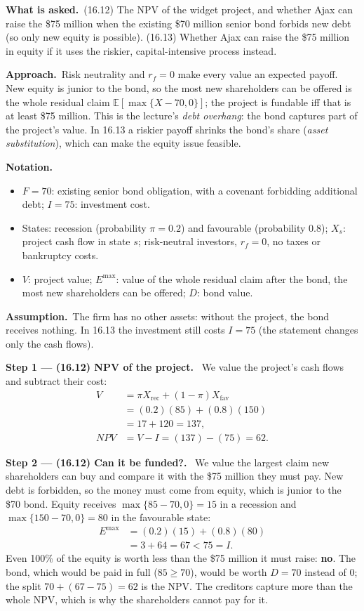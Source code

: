 \documentclass[11pt,a4paper]{article}
\newcommand{\notation}{\par\noindent\textbf{Notation.}}
\newcommand{\step}[2]{\par\medskip\noindent\textbf{Step #1 --- #2.}~}
\newcommand{\assume}{\par\smallskip\noindent\textbf{Assumption.}~}
\newcommand{\asked}{\par\medskip\noindent\textbf{What is asked.}~}
\newcommand{\approach}{\par\smallskip\noindent\textbf{Approach.}~}
\begin{document}
\asked (16.12) The NPV of the widget project, and whether Ajax can raise the \$75 million when
the existing \$70 million senior bond forbids new debt (so only new equity is possible).
(16.13) Whether Ajax can raise the \$75 million in equity if it uses the riskier, capital-intensive
process instead.

\approach Risk neutrality and $r_f=0$ make every value an expected payoff. New equity is junior to
the bond, so the most new shareholders can be offered is the whole residual claim
$\mathbb{E}[\max\{X-70,0\}]$; the project is fundable iff that is at least \$75 million. This is the
lecture's \emph{debt overhang}: the bond captures part of the project's value. In 16.13 a riskier
payoff shrinks the bond's share (\emph{asset substitution}), which can make the equity issue
feasible.

\notation
\begin{itemize}
  \item $F=70$: existing senior bond obligation, with a covenant forbidding additional debt; $I=75$: investment cost.
  \item States: recession (probability $\pi=0.2$) and favourable (probability $0.8$); $X_s$: project cash flow in state $s$; risk-neutral investors, $r_f=0$, no taxes or bankruptcy costs.
  \item $V$: project value; $E^{\max}$: value of the whole residual claim after the bond, the most new shareholders can be offered; $D$: bond value.
\end{itemize}

\assume The firm has no other assets: without the project, the bond receives nothing. In 16.13
the investment still costs $I=75$ (the statement changes only the cash flows).

\step{1}{(16.12) NPV of the project} We value the project's cash flows and subtract their cost:
\begin{align}
  V &= \pi X_{\text{rec}}+(1-\pi)X_{\text{fav}} \label{t4e7-V}\\
    &= (0.2)(85)+(0.8)(150) \nonumber\\
    &= 17+120 = 137, \nonumber\\
  \mathit{NPV} &= V-I = (137)-(75) = 62. \label{t4e7-NPV}
\end{align}

\step{2}{(16.12) Can it be funded?} We value the largest claim new shareholders can buy and
compare it with the \$75 million they must pay. New debt is forbidden, so the money must come from
equity, which is junior to the \$70 bond. Equity receives $\max\{85-70,0\}=15$ in a recession and
$\max\{150-70,0\}=80$ in the favourable state:
\begin{align}
  E^{\max} &= (0.2)(15)+(0.8)(80) \label{t4e7-E1}\\
           &= 3+64 = 67 < 75 = I. \nonumber
\end{align}
Even 100\% of the equity is worth less than the \$75 million it must raise: \textbf{no}. The
bond, which would be paid in full ($85\ge 70$), would be worth $D=70$ instead of $0$; the
split $70+(67-75)=62$ is the NPV. The creditors capture more than the whole NPV, which is why
the shareholders cannot pay for it.
\end{document}
